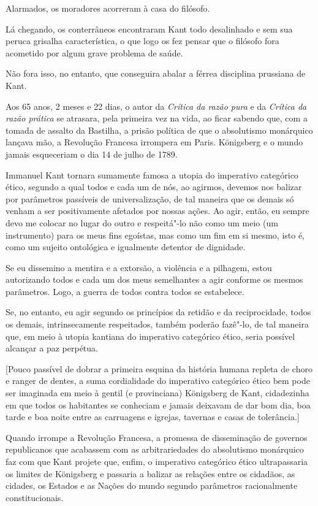 Alarmados, os moradores acorreram à casa do filósofo.

Lá chegando, os conterrâneos encontraram Kant todo desalinhado e sem sua
peruca grisalha característica, o que logo os fez pensar que o filósofo
fora acometido por algum grave problema de saúde.

Não fora isso, no entanto, que conseguira abalar a férrea disciplina
prussiana de Kant.

Aos 65 anos, 2 meses e 22 dias, o autor da \emph{Crítica da razão pura}
e da \emph{Crítica da razão prática} se atrasara, pela primeira vez na
vida, ao ficar sabendo que, com a tomada de assalto da Bastilha, a
prisão política de que o absolutismo monárquico lançava mão, a Revolução
Francesa irrompera em Paris. Königsberg e o mundo jamais esqueceriam o
dia 14 de julho de 1789.

Immanuel Kant tornara sumamente famosa a utopia do imperativo categórico
ético, segundo a qual todos e cada um de nós, ao agirmos, devemos nos
balizar por parâmetros passíveis de universalização, de tal maneira que
os demais só venham a ser positivamente afetados por nossas ações. Ao
agir, então, eu sempre devo me colocar no lugar do outro e respeitá"-lo
não como um meio (um instrumento) para os meus fins egoístas, mas como
um fim em si mesmo, isto é, como um sujeito ontológica e igualmente
detentor de dignidade.

Se eu dissemino a mentira e a extorsão, a violência e a pilhagem, estou
autorizando todos e cada um dos meus semelhantes a agir conforme os
mesmos parâmetros. Logo, a guerra de todos contra todos se estabelece.

Se, no entanto, eu agir segundo os princípios da retidão e da
reciprocidade, todos os demais, intrinsecamente respeitados, também
poderão fazê"-lo, de tal maneira que, em meio à utopia kantiana do
imperativo categórico ético, seria possível alcançar a paz perpétua.

{[}Pouco passível de dobrar a primeira esquina da história humana
repleta de choro e ranger de dentes, a suma cordialidade do imperativo
categórico ético bem pode ser imaginada em meio à gentil (e provinciana)
Königsberg de Kant, cidadezinha em que todos os habitantes se conheciam
e jamais deixavam de dar bom dia, boa tarde e boa noite entre as
carruagens e igrejas, tavernas e casas de tolerância.{]}

Quando irrompe a Revolução Francesa, a promessa de disseminação de
governos republicanos que acabassem com as arbitrariedades do
absolutismo monárquico faz com que Kant projete que, enfim, o imperativo
categórico ético ultrapassaria os limites de Königsberg e passaria a
balizar as relações entre os cidadãos, as cidades, os Estados e as
Nações do mundo segundo parâmetros racionalmente constitucionais.

